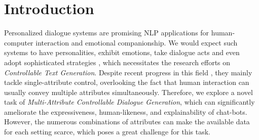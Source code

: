 \section{Introduction}
\label{sec:intro}
Personalized dialogue systems are promising NLP applications for human-computer interaction and emotional companionship. We would expect such systems to have personalities, exhibit emotions, take dialogue acts and even adopt sophisticated strategies \citep{liu2021towards}, which necessitates the research efforts on \textit{Controllable Text Generation}. Despite recent progress in this field \citep{dathathri2019plug,keskar2019ctrl,krause2021gedi}, they mainly tackle single-attribute control, overlooking the fact that human interaction can usually convey multiple attributes simultaneously. Therefore, we explore a novel task of \textit{Multi-Attribute Controllable 
Dialogue Generation}, which can significantly ameliorate the expressiveness, human-likeness, and explainability of chat-bots. However, the numerous combinations of attributes can make the available data for each setting scarce, which poses a great challenge for this task.


